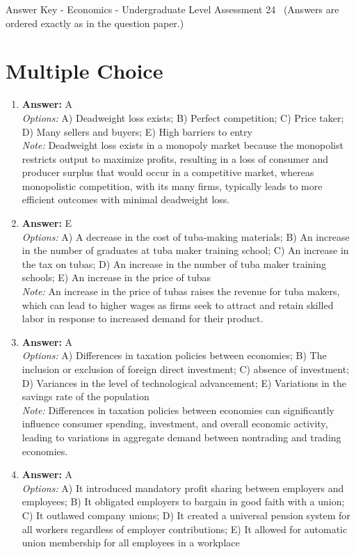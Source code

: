 \documentclass[12pt]{article}
\begin{document}
\begin{center}
Answer Key - Economics - Undergraduate Level Assessment 24 \
\small (Answers are ordered exactly as in the question paper.)
\end{center}

\section*{Multiple Choice}
\begin{enumerate}[label=\arabic*.]
\item \textbf{Answer:} A
\\ \textit{Options:} A) Deadweight loss exists; B) Perfect competition; C) Price taker; D) Many sellers and buyers; E) High barriers to entry
\\ \textit{Note:} Deadweight loss exists in a monopoly market because the monopolist restricts output to maximize profits, resulting in a loss of consumer and producer surplus that would occur in a competitive market, whereas monopolistic competition, with its many firms, typically leads to more efficient outcomes with minimal deadweight loss.
\item \textbf{Answer:} E
\\ \textit{Options:} A) A decrease in the cost of tuba-making materials; B) An increase in the number of graduates at tuba maker training school; C) An increase in the tax on tubas; D) An increase in the number of tuba maker training schools; E) An increase in the price of tubas
\\ \textit{Note:} An increase in the price of tubas raises the revenue for tuba makers, which can lead to higher wages as firms seek to attract and retain skilled labor in response to increased demand for their product.
\item \textbf{Answer:} A
\\ \textit{Options:} A) Differences in taxation policies between economies; B) The inclusion or exclusion of foreign direct investment; C) absence of investment; D) Variances in the level of technological advancement; E) Variations in the savings rate of the population
\\ \textit{Note:} Differences in taxation policies between economies can significantly influence consumer spending, investment, and overall economic activity, leading to variations in aggregate demand between nontrading and trading economies.
\item \textbf{Answer:} A
\\ \textit{Options:} A) It introduced mandatory profit sharing between employers and employees; B) It obligated employers to bargain in good faith with a union; C) It outlawed company unions; D) It created a universal pension system for all workers regardless of employer contributions; E) It allowed for automatic union membership for all employees in a workplace

\end{enumerate}
\end{document}
